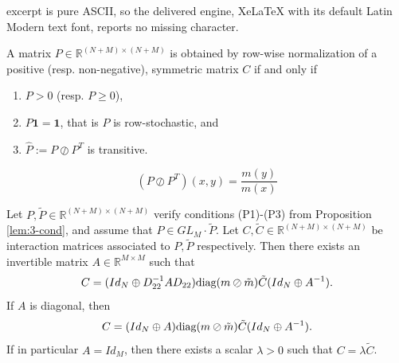 \documentclass[10pt,a4paper]{amsart}
\newcommand{\R}{{\mathbb R}}
\begin{document}
excerpt is pure ASCII, so the delivered engine, XeLaTeX with its default Latin Modern text font, reports no missing character.
\begin{proposition}\label{lem:3-cond}
    A matrix $P\in \R^{(N+M)\times (N+M)}$ is obtained by row-wise normalization of a positive (resp. non-negative), symmetric matrix $C$ if and only if
    \begin{enumerate}[label=(P\arabic*)]
    \item \label{cond-p1} $P> 0$ (resp. $P\geq 0$),
    \item \label{cond-p2} $P\mathbf 1 = \mathbf 1$, that is $P$ is row-stochastic, and
    \item \label{cond-p3} $\hat P := P\oslash P^T$ is transitive.
\end{enumerate}
\end{proposition}

\begin{equation}\label{PoslashPT-transitive}
    (P\oslash P^T)(x,y) = \frac{m(y)}{m(x)}
\end{equation} 

\begin{proposition}\label{C-from-P-new}

Let $P,\tilde P \in \R^{(N+M)\times (N+M)}$ verify conditions (P1)-(P3) from Proposition \ref{lem:3-cond}, and assume that $P\in GL_M\cdot\tilde P$. Let $C, \tilde C \in \R^{(N+M)\times (N+M)}$ be interaction matrices associated to $P, \tilde P$  respectively. Then there exists an invertible matrix $A \in \R^{M\times M}$ such that $$C =(Id_N\oplus D_{22}^{-1}AD_{22}) \mbox{\emph{diag}}(m\oslash \tilde m)\tilde C (Id_N\oplus A^{-1}).$$ 
    If $A$ is diagonal, then 
    $$C =(Id_N\oplus A) \mbox{\emph{diag}}(m\oslash \tilde m)\tilde C (Id_N\oplus A^{-1}).$$
    If in particular $A=Id_M$, then there exists a scalar $\lambda>0$ such that $C=\lambda\tilde C$.
\end{proposition}
\end{document}
